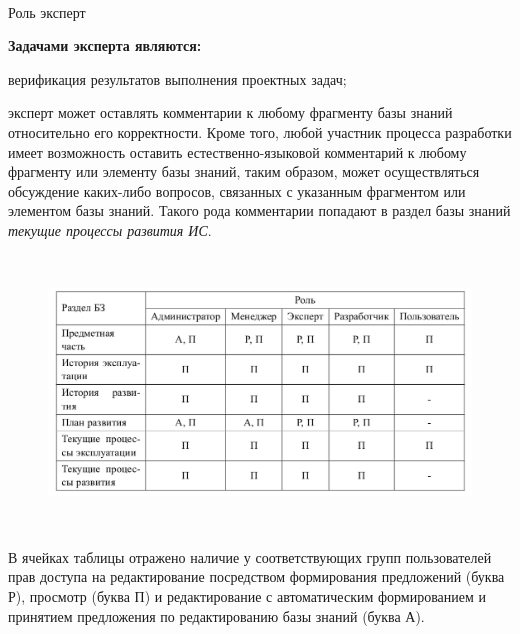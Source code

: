 \begin{frame}{\\Роль эксперт}
	\topline
	\justifying
	\begin{SCn}
		\textbf{Задачами эксперта являются:}
			\begin{textitemize}
				\item верификация результатов выполнения проектных задач;
				\item эксперт может оставлять комментарии к любому фрагменту базы знаний относительно его корректности. Кроме того, любой участник процесса разработки имеет возможность оставить естественно-языковой комментарий к любому фрагменту или элементу базы знаний, таким образом, может осуществляться обсуждение каких-либо вопросов, связанных с указанным фрагментом или элементом базы знаний. Такого рода комментарии попадают в раздел базы знаний \textit{текущие процессы развития ИС}.
			\end{textitemize}
	\end{SCn}
\end{frame}

\begin{frame}{\\}
	\topline
	\justifying
	
	\begin{SCn}
		\begin{figure}[H]
			\includegraphics[scale=0.3]{./figures/sd_kb_develop_methods/table.png}
		\end{figure}
	\end{SCn}
\end{frame}

\begin{frame}{\\}
	\topline
	\justifying
	
	\begin{SCn}
		В ячейках таблицы отражено наличие	у соответствующих групп пользователей прав доступа на редактирование посредством формирования предложений (буква Р), просмотр (буква П) и редактирование с автоматическим формированием и принятием предложения по редактированию базы знаний (буква А).
	\end{SCn}
\end{frame}


